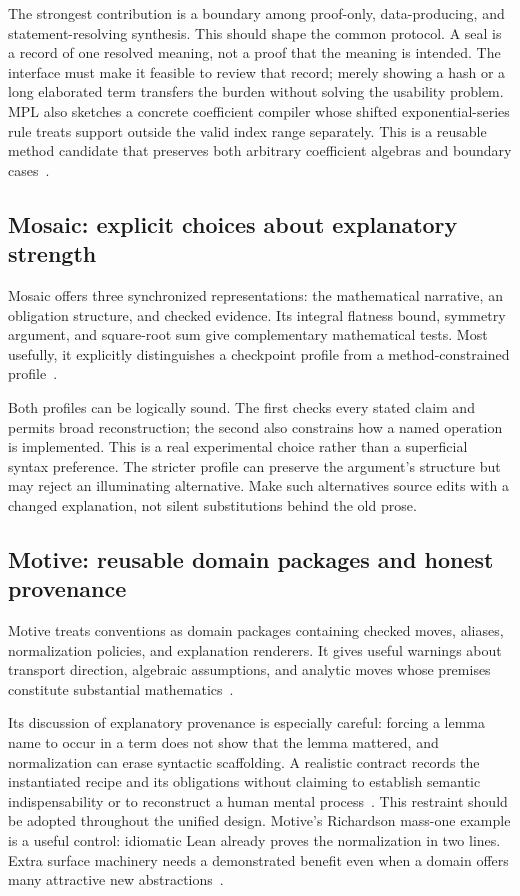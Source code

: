 \documentclass[11pt,letterpaper]{article}
\begin{document}
The strongest contribution is a boundary among proof-only, data-producing, and
statement-resolving synthesis. This should shape the common protocol. A seal is a
record of one resolved meaning, not a proof that the meaning is intended. The
interface must make it feasible to review that record; merely showing a hash or
a long elaborated term transfers the burden without solving the usability problem.
MPL also sketches a concrete coefficient compiler whose shifted exponential-series
rule treats support outside the valid index range separately. This is a reusable
method candidate that preserves both arbitrary coefficient algebras and boundary
cases~\cite[\S8.4]{mpl}.

\subsection{Mosaic: explicit choices about explanatory strength}
Mosaic offers three synchronized representations: the mathematical narrative, an
obligation structure, and checked evidence. Its integral flatness bound, symmetry
argument, and square-root sum give complementary mathematical tests. Most usefully,
it explicitly distinguishes a checkpoint profile from a method-constrained
profile~\cite[\S\S4,6--9]{mosaic}.

Both profiles can be logically sound. The first checks every stated claim and
permits broad reconstruction; the second also constrains how a named operation is
implemented. This is a real experimental choice rather than a superficial syntax
preference. The stricter profile can preserve the argument's structure but may
reject an illuminating alternative. Make such alternatives source edits with a
changed explanation, not silent substitutions behind the old prose.

\subsection{Motive: reusable domain packages and honest provenance}
Motive treats conventions as domain packages containing checked moves, aliases,
normalization policies, and explanation renderers. It gives useful warnings about
transport direction, algebraic assumptions, and analytic moves whose premises
constitute substantial mathematics~\cite[\S8]{motive}.

Its discussion of explanatory provenance is especially careful: forcing a lemma
name to occur in a term does not show that the lemma mattered, and normalization
can erase syntactic scaffolding. A realistic contract records the instantiated
recipe and its obligations without claiming to establish semantic indispensability
or to reconstruct a human mental process~\cite[\S9.4]{motive}. This restraint should
be adopted throughout the unified design.
Motive's Richardson mass-one example is a useful control: idiomatic Lean already
proves the normalization in two lines. Extra surface machinery needs a demonstrated
benefit even when a domain offers many attractive new abstractions~\cite[\S2.3]{motive}.
\end{document}
